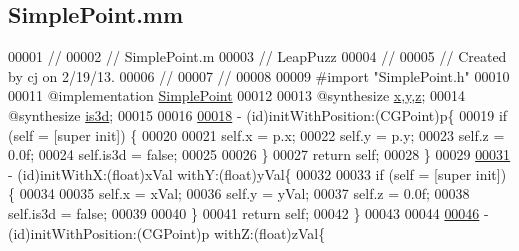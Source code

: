 \hypertarget{_simple_point_8mm}{\subsection{Simple\-Point.\-mm}
\label{d1/d15/_simple_point_8mm}
}

\begin{DoxyCode}
00001 \textcolor{comment}{//}
00002 \textcolor{comment}{//  SimplePoint.m}
00003 \textcolor{comment}{//  LeapPuzz}
00004 \textcolor{comment}{//}
00005 \textcolor{comment}{//  Created by cj on 2/19/13.}
00006 \textcolor{comment}{//}
00007 \textcolor{comment}{//}
00008 
00009 \textcolor{preprocessor}{#import "SimplePoint.h"}
00010 
00011 \textcolor{keyword}{@implementation }\hyperlink{interface_simple_point}{SimplePoint}
00012 
00013 \textcolor{keyword}{@synthesize} \hyperlink{interface_simple_point_abb16aaf6215e9e946606b30199b1c3af}{x},\hyperlink{interface_simple_point_ae10ba2c5156e6061258a0720443cd1c8}{y},\hyperlink{interface_simple_point_ad74ae8e5d653579e791c040155e7d4d6}{z};
00014 \textcolor{keyword}{@synthesize} \hyperlink{interface_simple_point_ad56fae41f389d3c12b4023c3e797f452}{is3d};
00015 
00016 
\hypertarget{_simple_point_8mm_source_l00018}{}\hyperlink{interface_simple_point_aa138ca80c0a7a5fa1684c38483042a76}{00018} - (id)initWithPosition:(CGPoint)p\{
00019     \textcolor{keywordflow}{if} (\textcolor{keyword}{self} = [super init]) \{
00020 
00021         \textcolor{keyword}{self}.x = p.x;
00022         \textcolor{keyword}{self}.y = p.y;
00023         \textcolor{keyword}{self}.z = 0.0f;
00024         \textcolor{keyword}{self}.is3d = \textcolor{keyword}{false};
00025         
00026     \}
00027     \textcolor{keywordflow}{return} \textcolor{keyword}{self};
00028 \}
00029 
\hypertarget{_simple_point_8mm_source_l00031}{}\hyperlink{interface_simple_point_a9ded444176a17c3ff2c398c17e6c7c74}{00031} - (id)initWithX:(\textcolor{keywordtype}{float})xVal withY:(\textcolor{keywordtype}{float})yVal\{
00032     
00033     \textcolor{keywordflow}{if} (\textcolor{keyword}{self} = [super init]) \{
00034         
00035         \textcolor{keyword}{self}.x = xVal;
00036         \textcolor{keyword}{self}.y = yVal;
00037         \textcolor{keyword}{self}.z = 0.0f;
00038         \textcolor{keyword}{self}.is3d = \textcolor{keyword}{false};
00039         
00040     \}
00041     \textcolor{keywordflow}{return} \textcolor{keyword}{self};
00042 \}
00043 
00044 
\hypertarget{_simple_point_8mm_source_l00046}{}\hyperlink{interface_simple_point_a24776a0473601bcdf437ba02dbc89d5c}{00046} - (id)initWithPosition:(CGPoint)p withZ:(\textcolor{keywordtype}{float})zVal\{

\end{DoxyCode}
